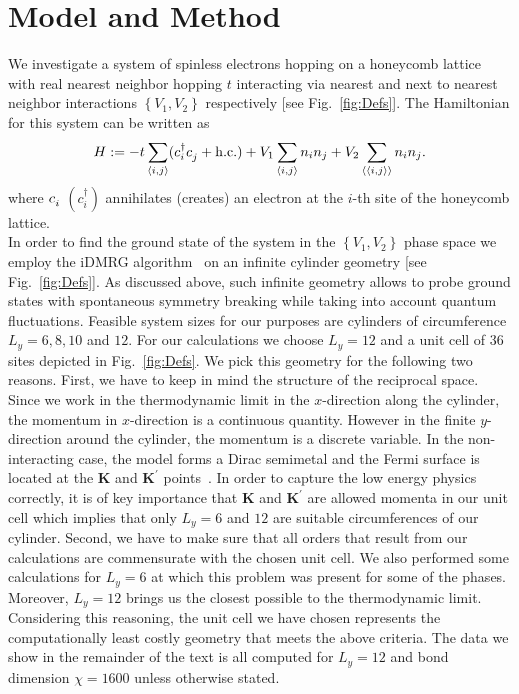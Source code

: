 \documentclass[aps,prx,10pt,twocolumn,floatfix,superscriptaddress,showpacs,numerical,footinbib]{revtex4-1}
\begin{document}
\section{\label{sec:modandmeth}Model and Method}
%
We investigate a system of spinless electrons hopping on a honeycomb lattice with real nearest neighbor hopping $t$ interacting via nearest and next to nearest neighbor interactions 
$\left\lbrace V_{1},V_{2}\right\rbrace$ respectively [see Fig.~\ref{fig:Defs}]. 
%
The Hamiltonian for this system can be written as
\begin{equation}
%
 H:=-t\sum_{\left\langle i,j\right\rangle}(c^{\dagger}_{i}c^{\vphantom{\dagger}}_{j}+ \mathrm{h.c.})+
V_{1}\sum_{\left\langle i,j\right\rangle }n_{i}n_{j}+
%
V_{2}\sum_{\left\langle \left\langle i,j\right\rangle \right\rangle }n_{i}n_{j}.
%
\label{eq:H}
\end{equation}
%
where $c_{i}^{\vphantom{\dagger}}$ $(c^{\dagger}_{i})$  annihilates (creates) an electron at the $i$-th site of the honeycomb lattice.\\
%
In order to find the ground state of the system in the $\left\lbrace V_{1},V_{2}\right\rbrace$ phase space
we employ the iDMRG algorithm~\cite{M08,W92,KZM13} on an infinite cylinder geometry [see Fig.~\ref{fig:Defs}].
%
As discussed above, such infinite geometry allows to probe ground states with spontaneous 
symmetry breaking while taking into account quantum fluctuations.
%
Feasible system sizes for our purposes are cylinders of circumference $L_{y} = 6,8,10$ and $12$.
%
For our calculations we choose $L_y=12$ and a unit cell of 36 sites depicted in Fig.~\ref{fig:Defs}.
%
We pick this geometry for the following two reasons.
%
First, 
%
we have to keep in mind the structure of the reciprocal space.
%
Since we work in the thermodynamic limit in the $x$-direction along the cylinder, the momentum in $x$-direction is a continuous quantity.
%
However in the finite $y$-direction around the cylinder, the momentum is a discrete variable.
%
In the non-interacting case, the model forms a Dirac semimetal and the Fermi surface is located at the 
$\mathbf{K}$ and $\mathbf{K}^{\prime}$ points~\cite{CastroNeto2009}.
%
In order to capture the low energy physics correctly, it is of key importance that $\mathbf{K}$ and $\mathbf{K}^{\prime}$ are allowed momenta in our unit cell which implies that only $L_y=6$ and $12$ are suitable circumferences of our cylinder.
%
Second, we have to make sure that all orders that result from our calculations are commensurate with the chosen unit cell.
%
We also performed some calculations for $L_y=6$ at which this problem was present for some of the phases.
%
Moreover, $L_y=12$ brings us the closest possible to the thermodynamic limit.
%
Considering this reasoning, the unit cell we have chosen represents the computationally least costly geometry that meets the above criteria.
%
The data we show in the remainder of the text is all computed for $L_y = 12$ and bond dimension $\chi = 1600$ unless otherwise stated.
\end{document}
